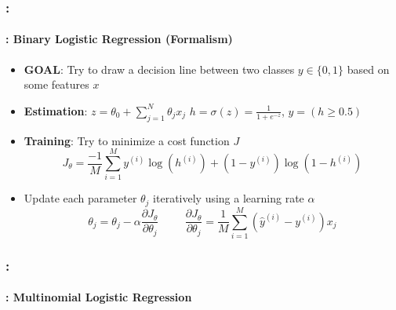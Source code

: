 \documentclass[xcolor=table]{beamer}
\begin{document}
\begin{frame}
	\frametitle{\insertshortsubtitle: \insertsection}
	\framesubtitle{\insertsubsection: Binary Logistic Regression (Formalism)}
	
	\begin{minipage}{0.5\textwidth} 
		\begin{itemize}
			\item \textbf{GOAL}: Try to draw a decision line between two classes $ y \in \{0, 1\} $ based on some features $ x $
			\item \textbf{Estimation}: $ z = \theta_0 + \sum_{j=1}^{N} \theta_j x_j $
			$ h = \sigma(z) = \frac{1}{1 + e^{-z}}$, $ \hat{y} = (h \ge 0.5)$
		\end{itemize}
	\end{minipage}
	\begin{minipage}{0.49\textwidth} 
	\end{minipage}
	
	\begin{itemize}
		\item \textbf{Training}: Try to minimize a cost function $ J $
		\[J_\theta = \frac{-1}{M} \sum\limits_{i=1}^{M} y^{(i)} \log(h^{(i)}) + (1- y^{(i)}) \log(1 - h^{(i)})\]
		\item Update each parameter $ \theta_j $ iteratively using a learning rate $ \alpha $
		\[\theta_j = \theta_j - \alpha \frac{\partial J_\theta}{\partial \theta_j}
		\hspace{1cm}
		\frac{\partial J_\theta}{\partial \theta_j} = \frac{1}{M} \sum\limits_{i=1}^{M} (\hat{y}^{(i)} - y^{(i)}) x_j
		\]
	\end{itemize}
	
\end{frame}

\begin{frame}
	\frametitle{\insertshortsubtitle: \insertsection}
	\framesubtitle{\insertsubsection: Multinomial Logistic Regression}
	
	\begin{minipage}{0.6\textwidth} 
	\end{minipage}
	\begin{minipage}{0.39\textwidth} 
	\end{minipage}
	
\end{frame}
\end{document}

